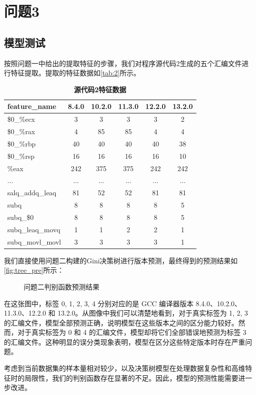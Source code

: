 
\section{问题3}
\subsection{模型测试}
按照问题一中给出的提取特征的步骤，我们对程序源代码2生成的五个汇编文件进行特征提取。提取的特征数据如\autoref{tab:2}所示。
\begin{table}[H]
\caption{\textbf{源代码2特征数据}}%
\label{tab:2}
\centering%
\begin{tabular}{lccccc}%
\toprule%
 feature\_name&8.4.0 & 10.2.0 & 11.3.0 & 12.2.0 & 13.2.0 \\
\midrule%
\$0\_\%ecx&3&3&3&3&2 \\
\$0\_\%rax&4 & 85 & 85 & 4 & 4 \\
\$0\_\%rbp&40 & 40 & 40 & 40 & 38 \\
\$0\_\%rsp&16 & 16 & 16 & 16 & 10 \\
\%eax & 242 & 375 & 375 & 242&242 \\
...&... & ... & ... & ... & ... \\
salq\_addq\_leaq&81 & 52 & 52 & 81 & 81 \\
subq&8 & 8 & 8 & 8 & 5 \\
subq\_\$0&8 & 8 & 8 & 8 & 5 \\
subq\_leaq\_movq&1 & 1 & 2 & 2 & 1 \\
subq\_movl\_movl&3 & 3 & 3 & 3 & 1 \\
\bottomrule%
\end{tabular}
\end{table}

我们直接使用问题二构建的Gini决策树进行版本预测，最终得到的预测结果如\autoref{fig:tree_pre}所示：
\begin{figure}[H]
    \centering
    \caption{问题二判别函数预测结果}
    \label{fig:tree_pre}
\end{figure}
在这张图中，标签 0, 1, 2, 3, 4 分别对应的是 GCC 编译器版本 8.4.0、10.2.0、11.3.0、12.2.0 和 13.2.0。从图像中我们可以清楚地看到，对于真实标签为 1, 2, 3 的汇编文件，模型全部预测正确，说明模型在这些版本之间的区分能力较好。然而，对于真实标签为 0 和 4 的汇编文件，模型却将它们全部错误地预测为标签 3 的汇编文件。这种明显的误分类现象表明，模型在区分这些特定版本时存在严重问题。

考虑到当前数据集的样本量相对较少，以及决策树模型在处理数据复杂性和高维特征时的局限性，我们的判别函数存在显著的不足。因此，模型的预测性能需要进一步改进。
\vspace*{1cm}

